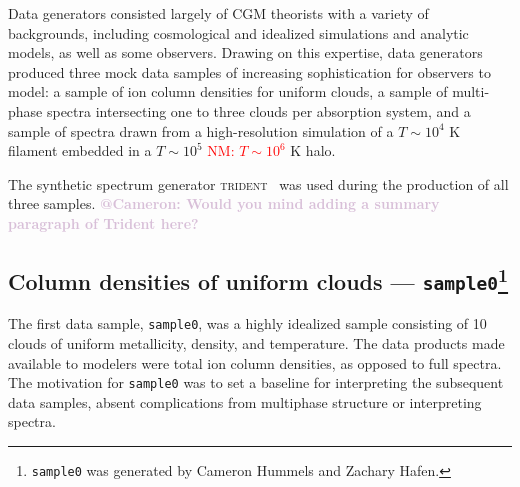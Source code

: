 \documentclass[fleqn,usenatbib]{mnras}
\makeatletter
\newcommand{\atcameron}[1]{\textcolor{Thistle}{\textbf{@Cameron: #1}}}
\newcommand{\nmr}[1]{\textcolor{red}{NM: #1}}
\makeatother
\begin{document}
Data generators consisted largely of CGM theorists with a variety of backgrounds, including cosmological and idealized simulations and analytic models, as well as some observers.
Drawing on this expertise, data generators produced three mock data samples of increasing sophistication for observers to model:
a sample of ion column densities for uniform clouds,
a sample of multi-phase spectra intersecting one to three clouds per absorption system,
and a sample of spectra drawn from a high-resolution simulation of a $T \sim 10^4$ K filament embedded in a \sout{$T \sim 10^5$} \nmr{$T \sim 10^6$} K halo.

The synthetic spectrum generator \textsc{trident}~\citep{Hummels2017} was used during the production of all three samples.
\atcameron{
Would you mind adding a summary paragraph of Trident here?
}

\subsection[Column densities of uniform clouds --- \texttt{sample0}]{Column densities of uniform clouds --- \texttt{sample0}\footnote{
\texttt{sample0} was generated by Cameron Hummels and Zachary Hafen.}}
\label{s: data generation -- sample0}

The first data sample, \texttt{sample0}, was a highly idealized sample consisting of 10 clouds of uniform metallicity, density, and temperature.
The data products made available to modelers were total ion column densities, as opposed to full spectra.
The motivation for \texttt{sample0} was to set a baseline for interpreting the subsequent data samples, absent complications from multiphase structure or interpreting spectra.
\end{document}

